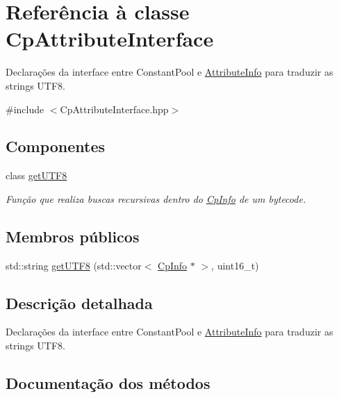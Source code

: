 \hypertarget{struct_cp_attribute_interface}{}\section{Referência à classe Cp\+Attribute\+Interface}
\label{struct_cp_attribute_interface}


Declarações da interface entre Constant\+Pool e \hyperlink{class_attribute_info}{Attribute\+Info} para traduzir as strings U\+T\+F8.  




{\ttfamily \#include $<$Cp\+Attribute\+Interface.\+hpp$>$}

\subsection*{Componentes}
\begin{DoxyCompactItemize}
\item 
class \hyperlink{class_cp_attribute_interface_1_1get_u_t_f8}{get\+U\+T\+F8}
\begin{DoxyCompactList}\small\item\em Função que realiza buscas recursivas dentro do \hyperlink{class_cp_info}{Cp\+Info} de um bytecode. \end{DoxyCompactList}\end{DoxyCompactItemize}
\subsection*{Membros públicos}
\begin{DoxyCompactItemize}
\item 
std\+::string \hyperlink{struct_cp_attribute_interface_a99cabbc15a0af5273a6d324dfbc78f41}{get\+U\+T\+F8} (std\+::vector$<$ \hyperlink{class_cp_info}{Cp\+Info} $\ast$ $>$, uint16\+\_\+t)
\end{DoxyCompactItemize}


\subsection{Descrição detalhada}
Declarações da interface entre Constant\+Pool e \hyperlink{class_attribute_info}{Attribute\+Info} para traduzir as strings U\+T\+F8. 

\subsection{Documentação dos métodos}
